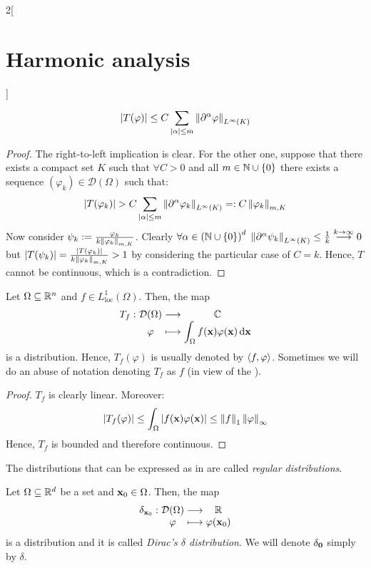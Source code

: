 \documentclass[../../../main_math.tex]{subfiles}
\begin{document}
\begin{multicols}{2}[\section{Harmonic analysis}]
\begin{proposition}
    $$\abs{T(\varphi)}\leq C\sum_{\abs{\alpha}\leq m}\left\|\partial^\alpha\varphi\right\|_{L^\infty(K)}$$
  \end{proposition}
  \begin{proof}
    The right-to-left implication is clear. For the other one, suppose that there exists a compact set $K$ such that $\forall C>0$ and all $m\in\mathbb{N}\cup\{0\}$ there exists a sequence $(\varphi_k)\in\mathcal{D}(\Omega)$ such that:
    $$\abs{T(\varphi_k)}> C\sum_{\abs{\alpha}\leq m}\left\|\partial^\alpha\varphi_k\right\|_{L^\infty(K)}=:C\left\|\varphi_k\right\|_{m,K}$$
    Now consider $\psi_k:=\frac{\varphi_k}{k\left\|\varphi_k\right\|_{m,K}}$. Clearly $\forall \alpha\in {(\ensuremath{\mathbb{N}}\cup\{0\})}^d$ $\left\|\partial^\alpha\psi_k\right\|_{L^\infty(K)}\leq\frac{1}{k}\overset{k\to\infty}{\longrightarrow}0$ but $\abs{T(\psi_k)}=\frac{\abs{T(\varphi_k)}}{k\left\|\varphi_k\right\|_{m,K}}>1$ by considering the particular case of $C=k$. Hence, $T$ cannot be continuous, which is a contradiction.
  \end{proof}
  \begin{proposition}
    Let $\Omega\subseteq \mathbb{R}^n$ and $f\in L_{\mathrm{loc}}^1(\Omega)$. Then, the map
    \begin{equation}\label{HA:regularDistribution}
      \function{T_f}{\mathcal{D}(\Omega)}{\CC}{\varphi}{\displaystyle\int_\Omega f(\vf{x})\varphi(\vf{x})\dd{\vf{x}}}
    \end{equation}
    is a distribution. Hence, $T_f(\varphi)$ is usually denoted by ${\left\langle f,\varphi\right\rangle}$. Sometimes we will do an abuse of notation denoting $T_f$ as $f$ (in view of the ).
  \end{proposition}
  \begin{proof}
    $T_f$ is clearly linear. Moreover: $$\abs{T_f(\varphi)}\leq\int_\Omega\abs{f(\boldsymbol{\mathrm{x}})\varphi(\boldsymbol{\mathrm{x}})}\leq \left\|f\right\|_1\left\|\varphi\right\|_\infty$$
    Hence, $T_f$ is bounded and therefore continuous.
  \end{proof}
  \begin{definition}
    The distributions that can be expressed as in  are called \emph{regular distributions}.
  \end{definition}
  \begin{proposition}
    Let $\Omega\subseteq \mathbb{R}^d$ be a set and $\boldsymbol{\mathrm{x}}_0\in\Omega$. Then, the map
    $$
      \function{\delta_{\vf{x}_0}}{\mathcal{D}(\Omega)}{\RR}{\varphi}{\varphi(\vf{x}_0)}
    $$
    is a distribution and it is called \emph{Dirac's $\delta$ distribution}. We will denote $\delta_{\boldsymbol{\mathrm{0}}}$ simply by $\delta$.

\end{proposition}
\end{multicols}
\end{document}
